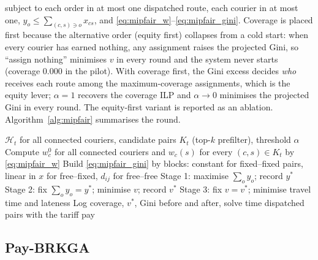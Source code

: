 \documentclass[preprint,12pt,authoryear]{elsarticle}%
\newcommand{\Hist}{\mathcal{H}}
\begin{document}
subject to each order in at most one dispatched route, each courier in at most one, $y_o \le \sum_{(c,s) \ni o} x_{cs}$, and \eqref{eq:mipfair_w}--\eqref{eq:mipfair_gini}. Coverage is placed first because the alternative order (equity first) collapses from a cold start: when every courier has earned nothing, any assignment raises the projected Gini, so ``assign nothing'' minimises $v$ in every round and the system never starts (coverage 0.000 in the pilot). With coverage first, the Gini excess decides \emph{who} receives each route among the maximum-coverage assignments, which is the equity lever; $\alpha = 1$ recovers the coverage ILP and $\alpha \to 0$ minimises the projected Gini in every round. The equity-first variant is reported as an ablation. Algorithm~\ref{alg:mipfair} summarises the round.

\begin{algorithm}[ht]
\caption{MIP-Fair round $t$}
\label{alg:mipfair}
\begin{algorithmic}[1]
\Require $\Hist_t$ for all connected couriers, candidate pairs $K_t$ (top-$k$ prefilter), threshold $\alpha$
\State Compute $w_c^0$ for all connected couriers and $w_c(s)$ for every $(c,s) \in K_t$ by \eqref{eq:mipfair_w}
\State Build \eqref{eq:mipfair_gini} by blocks: constant for fixed--fixed pairs, linear in $x$ for free--fixed, $d_{ij}$ for free--free
\State Stage 1: maximise $\sum_o y_o$; record $y^*$
\State Stage 2: fix $\sum_o y_o = y^*$; minimise $v$; record $v^*$
\State Stage 3: fix $v = v^*$; minimise travel time and lateness
\State Log coverage, $v^*$, Gini before and after, solve time
\State \Return dispatched pairs with the tariff pay
\end{algorithmic}
\end{algorithm}

\subsection{Pay-BRKGA}
\label{sec:paybrkga}
\end{document}
